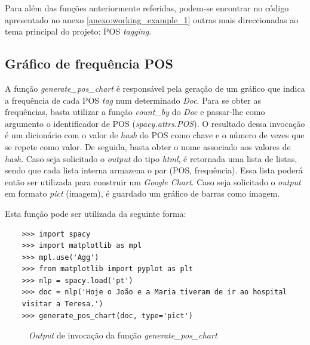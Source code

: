 \documentclass[12pt]{article}
\begin{document}
Para além das funções anteriormente referidas, podem-se encontrar no código apresentado no anexo \ref{anexo:working_example_1} outras mais direccionadas ao tema principal do projeto: POS \textit{tagging}. 

\subsection{Gráfico de frequência POS}

A função \textit{generate\_pos\_chart} é responsável pela geração de um gráfico que indica a frequência de cada POS \textit{tag} num determinado \textit{Doc}. Para se obter as frequências, basta utilizar a função \textit{count\_by} do \textit{Doc} e passar-lhe como argumento o identificador de POS (\textit{spacy.attrs.POS}). O resultado dessa invocação é um dicionário com o valor de \textit{hash} do POS como chave e o número de vezes que se repete como valor. De seguida, basta obter o nome associado aos valores de \textit{hash}. Caso seja solicitado o \textit{output} do tipo \textit{html}, é retornada uma lista de listas, sendo que cada lista interna armazena o par (POS, frequência). Essa lista poderá então ser utilizada para construir um \textit{Google Chart}. Caso seja solicitado o \textit{output} em formato \textit{pict} (imagem), é guardado um gráfico de barras como imagem.

Esta função pode ser utilizada da seguinte forma:

\begin{verbatim}
	>>> import spacy
	>>> import matplotlib as mpl
	>>> mpl.use('Agg')
	>>> from matplotlib import pyplot as plt
	>>> nlp = spacy.load('pt')
	>>> doc = nlp('Hoje o João e a Maria tiveram de ir ao hospital
	visitar a Teresa.')
	>>> generate_pos_chart(doc, type='pict')
\end{verbatim}

\begin{figure}[!ht]
	\centering
	\setlength{\abovecaptionskip}{-.8cm}
	\caption{\textit{Output} de invocação da função \textit{generate\_pos\_chart}}
	\label{figure:pos-frequence}
\end{figure}
\end{document}
